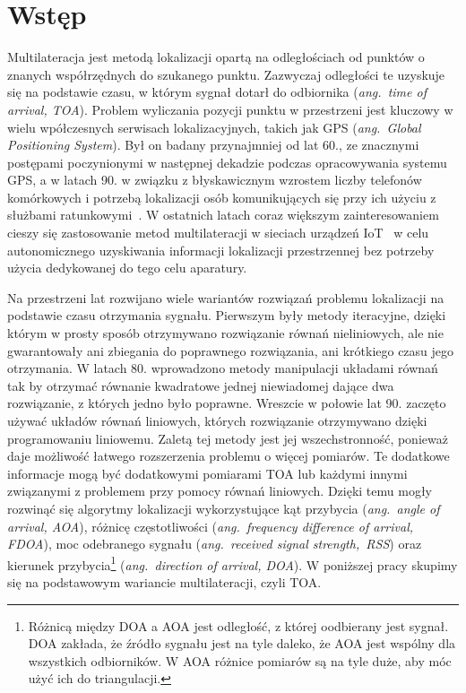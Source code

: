 \chapter*{Wstęp}\label{chap:introduction}

Multilateracja jest metodą lokalizacji opartą na odległościach od punktów o znanych współrzędnych do szukanego punktu. Zazwyczaj odległości te uzyskuje się na podstawie czasu, w którym sygnał dotarł do odbiornika (\textit{ang.\ time of arrival, TOA}). Problem wyliczania pozycji punktu w przestrzeni jest kluczowy w wielu wpółczesnych serwisach lokalizacyjnych, takich jak GPS (\textit{ang.\ Global Positioning System}). Był on badany przynajmniej od lat 60., ze znacznymi postępami poczynionymi w następnej dekadzie podczas opracowywania systemu GPS, a w latach 90. w związku z błyskawicznym wzrostem liczby telefonów komórkowych i potrzebą lokalizacji osób komunikujących się przy ich użyciu z służbami ratunkowymi~\cite{govinfo}. W ostatnich latach coraz większym zainteresowaniem cieszy się zastosowanie metod multilateracji w sieciach urządzeń IoT~\cite{9184896} w celu autonomicznego uzyskiwania informacji lokalizacji przestrzennej bez potrzeby użycia dedykowanej do tego celu aparatury.

Na przestrzeni lat rozwijano wiele wariantów rozwiązań problemu lokalizacji na podstawie czasu otrzymania sygnału. Pierwszym były metody iteracyjne, dzięki którym w prosty sposób otrzymywano rozwiązanie równań nieliniowych, ale nie gwarantowały ani zbiegania do poprawnego rozwiązania, ani krótkiego czasu jego otrzymania. W latach 80. wprowadzono metody manipulacji układami równań tak by otrzymać równanie kwadratowe jednej niewiadomej dające dwa rozwiązanie, z których jedno było poprawne. Wreszcie w połowie lat 90. zaczęto używać układów równań liniowych, których rozwiązanie otrzymywano dzięki programowaniu liniowemu. Zaletą tej metody jest jej wszechstronność, ponieważ daje możliwość łatwego rozszerzenia problemu o więcej pomiarów. Te dodatkowe informacje mogą być dodatkowymi  pomiarami TOA lub każdymi innymi związanymi z problemem przy pomocy równań liniowych. Dzięki temu mogły rozwinąć się algorytmy lokalizacji wykorzystujące kąt przybycia (\textit{ang.\ angle of arrival, AOA}), różnicę częstotliwości (\textit{ang.\ frequency difference of arrival, FDOA}), moc odebranego sygnału (\textit{ang.\ received signal strength,\ RSS}) oraz kierunek przybycia\footnote{Różnicą między DOA a AOA jest odległość, z której oodbierany jest sygnał. DOA zakłada, że źródło sygnału jest na tyle daleko, że AOA jest wspólny dla wszystkich odbiorników. W AOA różnice pomiarów są na tyle duże, aby móc użyć ich do triangulacji.} (\textit{ang.\ direction of arrival, DOA}). W poniższej pracy skupimy się na podstawowym wariancie multilateracji, czyli TOA.

